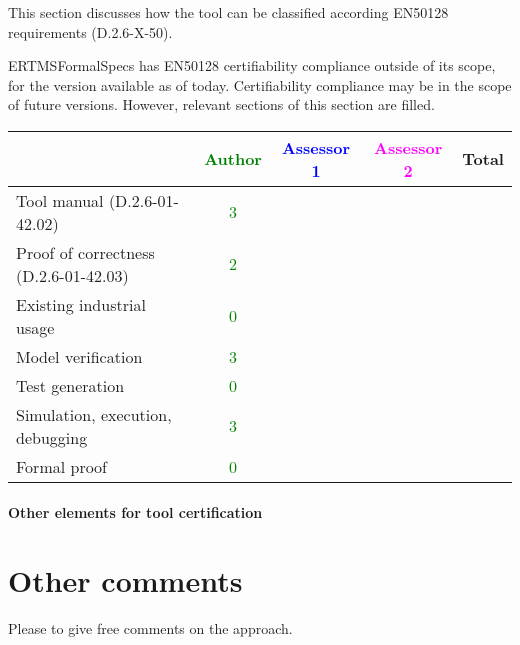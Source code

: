 This section discusses how the tool can be classified according EN50128 requirements (D.2.6-X-50).

\begin{author_comment}
ERTMSFormalSpecs has EN50128 certifiability compliance outside of its scope, for the version available as of today. Certifiability compliance may be in the scope of future versions. However, relevant sections of this section are filled.
\end{author_comment}


\begin{tabular}{|l | c | c | c | c|}
\hline
& \textcolor{green}{Author} & \textcolor{blue}{Assessor 1} & \textcolor{magenta}{Assessor 2} & Total \\
\hline 
Tool manual (D.2.6-01-42.02) & \textcolor{green}{3} & & &  \\
\hline
Proof of correctness (D.2.6-01-42.03)   & \textcolor{green}{2} & & & \\
\hline
Existing industrial  usage  &  \textcolor{green}{0} & & & \\
\hline
Model verification & \textcolor{green}{3} & & & \\
\hline
Test generation & \textcolor{green}{0} & & & \\
\hline
Simulation, execution, debugging & \textcolor{green}{3} & & & \\
\hline
Formal proof & \textcolor{green}{0} & & & \\
\hline
\end{tabular}

\paragraph{Other elements for tool certification}

\section{Other comments}
Please to  give free comments on the approach.



